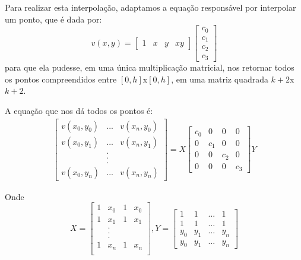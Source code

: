 \documentclass{article}
\begin{document}
	 Para realizar esta interpolação, adaptamos a equação responsável por interpolar um ponto, que é dada por:
	 \[
	 	v(x,y) = 
	 	\left[
	 		\begin{array}{llll}
		 		1 & x & y & xy
	 		\end{array}
	 	\right]
	 	\left[
	 		\begin{array}{llll}
	 		c_{0}\\
	 		c_{1}\\
	 		c_{2}\\
	 		c_{3}
	 		\end{array}
	 	\right]
	 \]
	  para que ela pudesse, em uma única multiplicação matricial, nos retornar todos os pontos compreendidos entre $[0, h]$x$[0, h]$, em uma matriz quadrada $k+2$x$k+2$. \par
	  A equação que nos dá todos os pontos é:
	  \begin{equation}
	  \begin{aligned}
	  	\left[
	  	\begin{array}{cccc}
	  	
	  		v(x_{0}, y_{0}) & ... & v(x_{n}, y_{0})\\
	  		v(x_{0}, y_{1}) & ... & v(x_{n}, y_{1})\\
	  				       &  .  &    \\
	  				       &  .  &    \\
	  				       &  .  &    \\ 	
	  		v(x_{0}, y_{n}) & ... & v(x_{n}, y_{n})
	  			
	  	\end{array}
	  	\right]
	  	= 
	  	X
	  	\left[
	  		\begin{array}{cccc}
	  			c_{0}     & 0     & 0     & 0\\
	  			0         & c_{1} & 0     & 0\\
	  			0         &  0    & c_{2} & 0\\
	  			0         &  0    &   0   & c_{3} 
	  		\end{array}
	  	\right]
	  	Y
	  	\end{aligned}
	  \end{equation}\par 
	  Onde 
	  \[
	  	X = 
	  	\left[
  		\begin{array}{cccc}
  			1 & x_{0} & 1 & x_{0}\\
  			1 & x_{1} & 1 & x_{1}\\
				&.\\
				&.\\
				&.\\
  			1 & x_{n} & 1 & x_{n}\\
  		\end{array}
  	\right]
  	,Y =
	  	\left[
	  		\begin{array}{cccc}
	  			1     & 1     & ...     & 1\\
	  			1     & 1     & ...     & 1\\
	  			y_{0} & y_{1} & ...     & y_{n}\\
	  			y_{0} & y_{1} & ...     & y_{n}
	  		\end{array}
	  	\right]
	  \]
\end{document}
